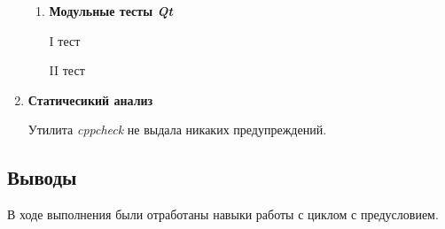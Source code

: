 \documentclass[12pt,a4paper]{report}
\begin{document}
\begin{enumerate}
\begin{enumerate}
\item \textbf{Модульные тесты \textit{Qt}}
\begin{description}
\item[I тест]
\hspace{\parindent}
\begin{flushleft}
\end{flushleft}
\end{description}

\begin{description}
\item[II тест]
\hspace{\parindent}
\begin{flushleft}
\end{flushleft}
\end{description}
\end{enumerate}
\item \textbf{Статичесикий анализ}

\hspace{\parindent} 
Утилита \textit{cppcheck} не выдала никаких предупреждений.
\end{enumerate}

\subsection{Выводы}
\hspace{\parindent}
В ходе выполнения были отработаны навыки работы с циклом с предусловием. 
\end{document}
